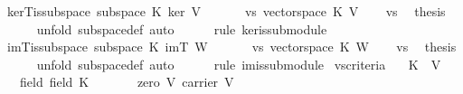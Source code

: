 \begin{isabellebody}
\isanewline
{}\isamarkupfalse%
\ kerT{\isacharunderscore}is{\isacharunderscore}subspace{\isacharcolon}\ {\isachardoublequoteopen}subspace\ K\ ker\ V{\isachardoublequoteclose}\isanewline
%
\isadelimproof
%
\endisadelimproof
%
\isatagproof
{}\isamarkupfalse%
\ {\isacharminus}\ \isanewline
\ \ \isamarkupfalse%
\ vs{\isacharcolon}\ {\isachardoublequoteopen}vectorspace\ K\ V{\isachardoublequoteclose}\isacommand{{\isachardot}{\isachardot}}\isamarkupfalse%
\isanewline
\ \ \isamarkupfalse%
\ vs\ \isamarkupfalse%
\ {\isacharquery}thesis\isanewline
\ \ \ \ \isamarkupfalse%
\ {\isacharparenleft}unfold\ subspace{\isacharunderscore}def{\isacharcomma}\ auto{\isacharparenright}\isanewline
\ \ \ \ \isamarkupfalse%
\ {\isacharparenleft}rule\ ker{\isacharunderscore}is{\isacharunderscore}submodule{\isacharparenright}\isanewline
{}\isamarkupfalse%
%
\endisatagproof
{\isafoldproof}%
%
\isadelimproof
\isanewline
%
\endisadelimproof
\isanewline
{}\isamarkupfalse%
\ imT{\isacharunderscore}is{\isacharunderscore}subspace{\isacharcolon}\ {\isachardoublequoteopen}subspace\ K\ imT\ W{\isachardoublequoteclose}\isanewline
%
\isadelimproof
%
\endisadelimproof
%
\isatagproof
{}\isamarkupfalse%
\ {\isacharminus}\ \isanewline
\ \ \isamarkupfalse%
\ vs{\isacharcolon}\ {\isachardoublequoteopen}vectorspace\ K\ W{\isachardoublequoteclose}\isacommand{{\isachardot}{\isachardot}}\isamarkupfalse%
\isanewline
\ \ \isamarkupfalse%
\ vs\ \isamarkupfalse%
\ {\isacharquery}thesis\isanewline
\ \ \ \ \isamarkupfalse%
\ {\isacharparenleft}unfold\ subspace{\isacharunderscore}def{\isacharcomma}\ auto{\isacharparenright}\isanewline
\ \ \ \ \isamarkupfalse%
\ {\isacharparenleft}rule\ im{\isacharunderscore}is{\isacharunderscore}submodule{\isacharparenright}\isanewline
{}\isamarkupfalse%
%
\endisatagproof
{\isafoldproof}%
%
\isadelimproof
\isanewline
%
\endisadelimproof
{}\isamarkupfalse%
\isanewline
\isanewline
{}\isamarkupfalse%
\ vs{\isacharunderscore}criteria{\isacharcolon}\isanewline
\ \ \ K\ \ V\ \isanewline
\ \ \ field{\isacharcolon}\ {\isachardoublequoteopen}field\ K{\isachardoublequoteclose}\isanewline
\ \ \ \ \ \ \ zero{\isacharcolon}\ {\isachardoublequoteopen}{\isasymzero}\isactrlbsub V\isactrlesub {\isasymin}\ carrier\ V{\isachardoublequoteclose}\ \isanewline

\end{isabellebody}
